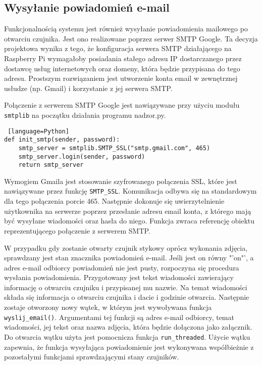\documentclass[a4paper,12pt,twoside]{article}
\begin{document}
\subsection{Wysyłanie powiadomień e-mail}
Funkcjonalnością systemu jest również wysyłanie powiadomienia mailowego po otwarciu czujnika. Jest ono realizowane poprzez serwer SMTP Google. Ta decyzja projektowa wynika z tego, że konfiguracja serwera SMTP działającego na Raspberry Pi wymagałoby posiadania stałego adresu IP dostarczanego przez dostawcę usług internetowych oraz domeny, która będzie przypisana do tego adresu. Prostszym rozwiązaniem jest utworzenie konta email w zewnętrznej usłudze (np. Gmail) i korzystanie z jej serwera SMTP. 

Połączenie z serwerem SMTP Google jest nawiązywane przy użyciu modułu \texttt{smtplib} na początku działania programu nadzor.py. 
\begin{lstlisting} [language=Python]
def init_smtp(sender, password):
    smtp_server = smtplib.SMTP_SSL("smtp.gmail.com", 465)
    smtp_server.login(sender, password)
    return smtp_server 
\end{lstlisting}
Wymogiem Gmaila jest stosowanie szyfrowanego połączenia SSL, które jest nawiązywane przez funkcję \texttt{SMTP{\_}SSL}. Komunikacja odbywa się na standardowym dla tego połączenia porcie 465. Następnie dokonuje się uwierzytelnienie użytkownika na serwerze poprzez przesłanie adresu email konta, z którego mają być wysyłane wiadomości oraz hasła do niego. Funkcja zwraca referencję obiektu reprezentującego połączenie z serwerem SMTP.

W przypadku gdy zostanie otwarty czujnik stykowy oprócz wykonania zdjęcia, sprawdzany jest stan znacznika powiadomień e-mail. Jeśli jest on równy "'on"', a adres e-mail odbiorcy powiadomień nie jest pusty, rozpoczyna się procedura wysłania powiadomienia. Przygotowany jest tekst wiadomości zawierający informację o otwarciu czujniku i przypisanej mu nazwie. Na temat wiadomości składa się informacja o otwarciu czujnika i dacie i godzinie otwarcia. Następnie zostaje otworzony nowy wątek, w którym jest wywoływana funkcja \texttt{wyslij{\_}email()}. Argumentami tej funkcji są adres e-mail odbiorcy, temat wiadomości, jej tekst oraz nazwa zdjęcia, która będzie dołączona jako załącznik. Do otwarcia wątku użyta jest pomocnicza funkcja \texttt{run{\_}threaded}. Użycie wątku zapewnia, że funkcja wysyłająca powiadomienie jest wykonywana współbieżnie z pozostałymi funkcjami sprawdzającymi stany czujników.
\end{document}

